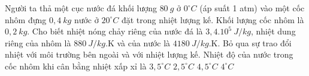 \begin{ex} 
	Người ta thả một cục nước đá khối lượng $80 \ g$ ở $0^\circ C$ (áp suất 1 atm) vào một cốc nhôm đựng $0,4 \ kg$ nước ở $20^\circ C$ đặt trong nhiệt lượng kế. Khối lượng cốc nhôm là $0,2 \ kg$. Cho biết nhiệt nóng chảy riêng của nước đá là $3,4.10^{5} \ J /kg$, nhiệt dung riêng của nhôm là $880 \ J /kg$.K và của nước là $4180 \ J /kg$.K. Bỏ qua sự trao đổi nhiệt với môi trường bên ngoài và với nhiệt lượng kế. Nhiệt độ của nước trong cốc nhôm khi cân bằng nhiệt xấp xỉ là
	\choice
	{$3,5^\circ C$}
	{$2,5^\circ C$}
	{\True $4,5^\circ C$}
	{$4^\circ C$}
\end{ex}
